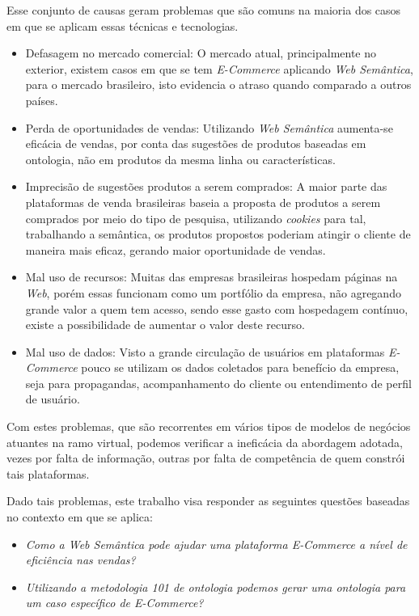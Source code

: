 Esse conjunto de causas geram problemas que são comuns na maioria dos casos em que se aplicam essas técnicas e tecnologias.

\begin{itemize}
\item Defasagem no mercado comercial: O mercado atual, principalmente no exterior, existem casos em que se tem \textit{E-Commerce} aplicando \textit{Web Semântica}, para o mercado brasileiro, isto evidencia o atraso quando comparado a outros países.
\item Perda de oportunidades de vendas: Utilizando \textit{Web Semântica} aumenta-se eficácia de vendas, por conta das sugestões de produtos baseadas em ontologia, não em produtos da mesma linha ou características.
\item Imprecisão de sugestões produtos a serem comprados: A maior parte das plataformas de venda brasileiras baseia a proposta de produtos a serem comprados por meio do tipo de pesquisa, utilizando \textit{cookies} para tal, trabalhando a semântica, os produtos propostos poderiam atingir o cliente de maneira mais eficaz, gerando maior oportunidade de vendas.
\item Mal uso de recursos: Muitas das empresas brasileiras hospedam páginas na \textit{Web}, porém essas funcionam como um portfólio da empresa, não agregando grande valor a quem tem acesso, sendo esse gasto com hospedagem contínuo, existe a possibilidade de aumentar o valor deste recurso.
\item Mal uso de dados: Visto a grande circulação de usuários em plataformas \textit{E-Commerce} pouco se utilizam os dados coletados para benefício da empresa, seja para propagandas, acompanhamento do cliente ou entendimento de perfil de usuário.
\end{itemize}

Com estes problemas, que são recorrentes em vários tipos de modelos de negócios atuantes na ramo virtual, podemos verificar a ineficácia da abordagem adotada, vezes por falta de informação, outras por falta de competência de quem constrói tais plataformas.

	Dado tais problemas, este trabalho visa responder as seguintes questões baseadas no contexto em que se aplica:

	\begin{itemize}
	\item{\textit{Como a Web Semântica pode ajudar uma plataforma E-Commerce a nível de eficiência nas vendas?}}
	\item{\textit{Utilizando a metodologia 101 de ontologia podemos gerar uma ontologia para um caso específico de E-Commerce?}}
	\end{itemize}

